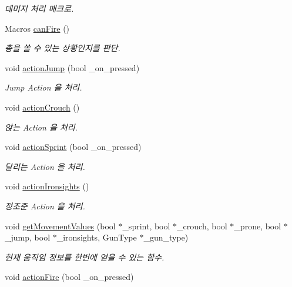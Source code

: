 \begin{DoxyCompactItemize}
\begin{DoxyCompactList}\small\item\em 데미지 처리 매크로. \end{DoxyCompactList}\item 
Macros \hyperlink{class_person___character_a28d17bdc4815d2aa467ddd484a9c273d}{can\+Fire} ()
\begin{DoxyCompactList}\small\item\em 총을 쏠 수 있는 상황인지를 판단. \end{DoxyCompactList}\item 
void \hyperlink{class_person___character_a9207e4718d388fe8af9b5506d1d2e66d}{action\+Jump} (bool \+\_\+on\+\_\+pressed)
\begin{DoxyCompactList}\small\item\em Jump Action 을 처리. \end{DoxyCompactList}\item 
void \hyperlink{class_person___character_a0991452dd5a0ea32b814cb38e1ed7ae7}{action\+Crouch} ()
\begin{DoxyCompactList}\small\item\em 앉는 Action 을 처리. \end{DoxyCompactList}\item 
void \hyperlink{class_person___character_af2570b18cab60a6967ea9572afd34392}{action\+Sprint} (bool \+\_\+on\+\_\+pressed)
\begin{DoxyCompactList}\small\item\em 달리는 Action 을 처리. \end{DoxyCompactList}\item 
void \hyperlink{class_person___character_a5cb52252ac24772509d8277dd45ea16c}{action\+Ironsights} ()
\begin{DoxyCompactList}\small\item\em 정조준 Action 을 처리. \end{DoxyCompactList}\item 
void \hyperlink{class_person___character_aaf8b6f95c71b9a20a78d8e40cc5ebfc1}{get\+Movement\+Values} (bool $\ast$\+\_\+sprint, bool $\ast$\+\_\+crouch, bool $\ast$\+\_\+prone, bool $\ast$\+\_\+jump, bool $\ast$\+\_\+ironsights, Gun\+Type $\ast$\+\_\+gun\+\_\+type)
\begin{DoxyCompactList}\small\item\em 현재 움직임 정보를 한번에 얻을 수 있는 함수. \end{DoxyCompactList}\item 
void \hyperlink{class_person___character_a37cd54aead0c3783a6a0e47382606216}{action\+Fire} (bool \+\_\+on\+\_\+pressed)

\end{DoxyCompactItemize}
